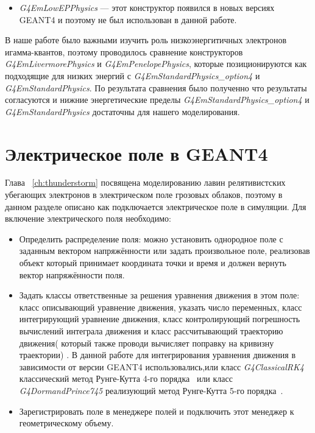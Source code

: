 \begin{itemize}
    \item \textit{G4EmLowEPPhysics} --- этот конструктор появился в новых версиях GEANT4 и поэтому не был использован в данной работе.
\end{itemize}
В наше работе  было важными изучить роль низкоэнергитичных электронов игамма-квантов, поэтому проводилось сравнение конструкторов  \textit{G4EmLivermorePhysics} и \textit{G4EmPenelopePhysics}, которые позиционируются как подходящие для низких энергий с \textit{G4EmStandardPhysics\_option4} и \textit{G4EmStandardPhysics}. По результата сравнения было полученно что результаты согласуются и нижние энергетические пределы  \textit{G4EmStandardPhysics\_option4} и \textit{G4EmStandardPhysics}  достаточны для нашего моделирования.

\section{Электрическое поле в GEANT4 }\label{sec:theory/efield}
Глава ~\ref{ch:thunderstorm} посвящена моделированию лавин релятивистских убегающих электронов в электрическом поле грозовых облаков, поэтому в данном разделе описано как подключается электрическое поле в симуляции. Для включение электрического поля необходимо: 
\begin{itemize}
    \item Определить распределение поля: можно установить однородное поле с заданным вектором напряжённости или задать произвольное поле, реализовав объект который принимает координата точки и время и должен вернуть вектор напряжённости поля.
    \item Задать классы ответственные за решения уравнения движения в этом поле: класс описывающий уравнение движения, указать число переменных, класс интегрирующий уравнение движения, класс контролирующий погрешность вычислений интеграла движения и класс рассчитывающий траекторию движения( который также проводи вычисляет поправку на кривизну траектории) . В данной работе для интегрирования уравнения движения в зависимости от версии GEANT4 использовались,или класс \textit{G4ClassicalRK4} классический метод Рунге-Кутта 4-го порядка~\cite{fedorenko1994} или класс \textit{G4DormandPrince745} реализующий метод Рунге-Кутта 5-го порядка~\cite{dormand1980family}. 
    \item Зарегистрировать поле в менеджере полей и подключить этот менеджер к геометрическому объему.
\end{itemize}

